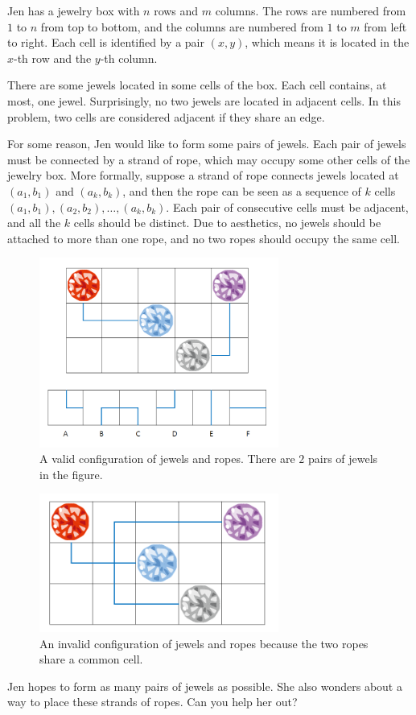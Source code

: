Jen has a jewelry box with $n$ rows and $m$ columns.
The rows are numbered from $1$ to $n$ from top to bottom, and the columns are numbered from $1$ to $m$ from left to right.
Each cell is identified by a pair $(x, y)$, which means it is located in the $x$-th row and the $y$-th column.

There are some jewels located in some cells of the box.
Each cell contains, at most, one jewel.
Surprisingly, no two jewels are located in adjacent cells.
In this problem, two cells are considered adjacent if they share an edge.

For some reason, Jen would like to form some pairs of jewels.
Each pair of jewels must be connected by a strand of rope, which may occupy some other cells of the jewelry box.
More formally, suppose a strand of rope connects jewels located at $(a_1,b_1)$ and $(a_k,b_k)$, and then the rope can be seen as a sequence of $k$ cells $(a_1,b_1),(a_2,b_2),\ldots,(a_k,b_k)$.
Each pair of consecutive cells must be adjacent, and all the $k$ cells should be distinct.
Due to aesthetics, no jewels should be attached to more than one rope, and no two ropes should occupy the same cell.
\begin{figure}[h]
    \center
    \includegraphics[width=0.7\textwidth]{image/jewel1.png}
    \caption{A valid configuration of jewels and ropes. There are $2$ pairs of jewels in the figure.}
    \end{figure}
\newpage
    \begin{figure}[h]
    \center
    \includegraphics[width=0.7\textwidth]{image/jewel2.png}
    \caption{An invalid configuration of jewels and ropes because the two ropes share a common cell.}
    \end{figure}
Jen hopes to form as many pairs of jewels as possible. She also wonders about a way to place these strands of ropes. Can you help her out?